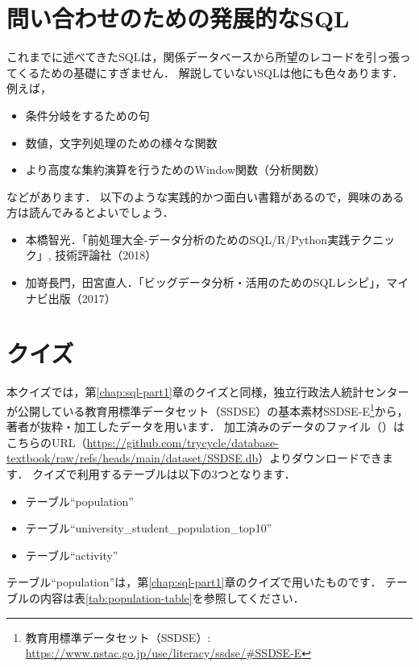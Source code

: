 \section{問い合わせのための発展的なSQL}
これまでに述べてきたSQLは，関係データベースから所望のレコードを引っ張ってくるための基礎にすぎません．
解説していないSQLは他にも色々あります．
例えば，
\begin{itemize}
\item 条件分岐をするための句
\item 数値，文字列処理のための様々な関数
\item より高度な集約演算を行うためのWindow関数（分析関数）
\end{itemize}
などがあります．
以下のような実践的かつ面白い書籍があるので，興味のある方は読んでみるとよいでしょう．
\begin{itemize}
\item 本橋智光．「前処理大全-データ分析のためのSQL/R/Python実践テクニック」, 技術評論社（2018）\cite{前処理大全}
\item 加嵜長門，田宮直人．「ビッグデータ分析・活用のためのSQLレシピ」，マイナビ出版（2017）\cite{SQLレシピ}
\end{itemize}


\hrulefill
\section{クイズ}

本クイズでは，第\ref{chap:sql-part1}章のクイズと同様，独立行政法人統計センターが公開している教育用標準データセット（SSDSE）の基本素材SSDSE-E\footnote{教育用標準データセット（SSDSE）: \url{https://www.nstac.go.jp/use/literacy/ssdse/\#SSDSE-E}}から，著者が抜粋・加工したデータを用います．
加工済みのデータのファイル（）はこちらのURL（\url{https://github.com/trycycle/database-textbook/raw/refs/heads/main/dataset/SSDSE.db}）よりダウンロードできます．
クイズで利用するテーブルは以下の3つとなります．
\begin{itemize}
\item テーブル``population''
\item テーブル``university\_student\_population\_top10''
\item テーブル``activity''
\end{itemize}

テーブル``population''は，第\ref{chap:sql-part1}章のクイズで用いたものです．
テーブルの内容は表\ref{tab:population-table}を参照してください．

